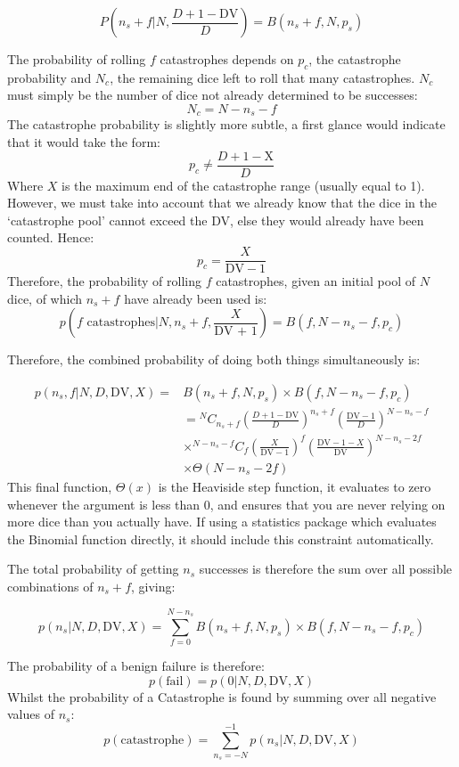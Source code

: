 $$ P\left(n_s + f | N,  \frac{D + 1 - \text{DV}}{D}  \right)  = B(n_s + f , N, p_s ) $$ 

The probability of rolling $f$ catastrophes depends on $p_c$, the catastrophe probability and $N_c$, the remaining dice left to roll that many catastrophes. $N_c$ must simply be the number of dice not already determined to be successes:
$$N_c = N - n_s - f$$
The catastrophe probability is slightly more subtle, a first glance would indicate that it would take the form:
$$ p_c \neq \frac{D + 1 - \text{X}}{D} $$
Where $X$ is the maximum end of the catastrophe range (usually equal to 1). However, we must take into account that we already know that the dice in the `catastrophe pool' cannot exceed the DV, else they would already have been counted. Hence:
$$ p_c = \frac{X}{\text{DV} - 1} $$
Therefore, the probability of rolling $f$ catastrophes, given an initial pool of $N$ dice, of which $n_s + f$ have already been used is:
$$p\left(f \text{ catastrophes} | N, n_s + f, \frac{X}{\text{DV + 1}} \right) = B(f, N- n_s -f, p_c) $$ 

Therefore, the combined probability of doing both things simultaneously is:

\begin{align*}
 p(n_s, f | N, D, \text{DV}, X)  =& B(n_s + f, N,p_s) \times B(f,N - n_s - f, p_c)
 \\
 & = {^N}C_{n_s + f} \left(\frac{D + 1 - \text{DV}}{D} \right)^{n_s + f} \left( \frac{ \text{DV} - 1}{D} \right)^{N - n_s - f}
 \\ 
	& \times {^{N - n_s - f}}C_f \left( \frac{X}{\text{DV} - 1} \right)^f \left(\frac{\text{DV} - 1 - X}{\text{DV}} \right)^{N - n_s - 2f}
	\\
	& \times \Theta(N - n_s - 2 f)
 \end{align*}
This final function, $\Theta(x)$ is the Heaviside step function, it evaluates to zero whenever the argument is less than 0, and ensures that you are never relying on more dice than you actually have. If using a statistics package which evaluates the Binomial function directly, it should include this constraint automatically. 

The total probability of getting $n_s$ successes is therefore the sum over all possible combinations of $n_s + f$, giving:

$$ p(n_s | N,D, \text{DV},X) = \sum_{f = 0}^{N - n_s}B(n_s + f, N,p_s) \times B(f,N - n_s - f, p_c)$$

The probability of a benign failure is therefore:
$$ p(\text{fail}) = p(0 | N,D, \text{DV}, X)$$
Whilst the probability of a Catastrophe is found by summing over all negative values of $n_s$:
$$ p(\text{catastrophe}) = \sum_{n_s = - N}^{-1} p(n_s | N, D, \text{DV}, X)$$

